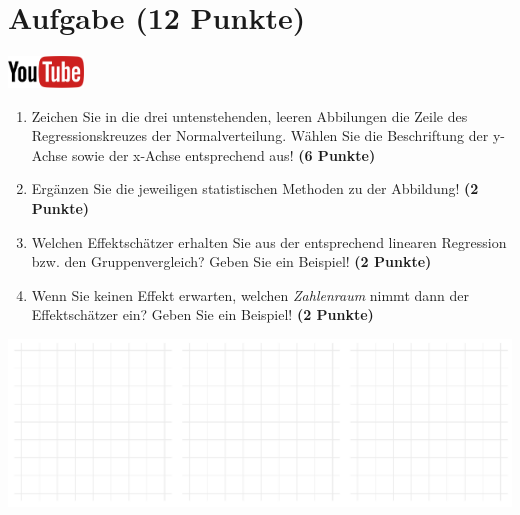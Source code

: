 \documentclass[a4paper, 9pt]{scrartcl}\usepackage[]{graphicx}\usepackage[]{xcolor}
\makeatletter
\def\maxwidth{ %
  \ifdim\Gin@nat@width>\linewidth
    \linewidth
  \else
    \Gin@nat@width
  \fi
}
\makeatother
\begin{document}
\clearpage

\section{Aufgabe \hfill (12 Punkte)}

\hfill\href{https://youtu.be/lHzRgm7hPw0}{\includegraphics[width =
  2cm]{img/youtube}}\\[1Ex]



\begin{enumerate}
\item Zeichen Sie in die drei untenstehenden, leeren Abbilungen die Zeile des
  Regressionskreuzes der Normalverteilung. W{\"a}hlen Sie die Beschriftung der
  y-Achse sowie der x-Achse entsprechend aus! \textbf{(6 Punkte)}
\item Erg{\"a}nzen Sie die jeweiligen statistischen Methoden zu der Abbildung! \textbf{(2 Punkte)}
\item Welchen Effektsch{\"a}tzer erhalten Sie aus der entsprechend linearen
  Regression bzw. den Gruppenvergleich? Geben Sie ein Beispiel! \textbf{(2 Punkte)}
\item Wenn Sie keinen Effekt erwarten, welchen \textit{Zahlenraum} nimmt dann
  der Effektsch{\"a}tzer ein? Geben Sie ein Beispiel! \textbf{(2 Punkte)}
\end{enumerate}



{\centering \includegraphics[width=\maxwidth]{img/regression-01-1} 

}



 
\clearpage
\end{document}
